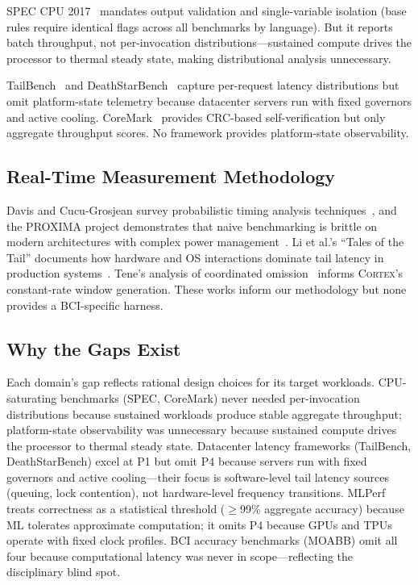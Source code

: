 \documentclass[sigplan,10pt]{acmart}
\newcommand{\cortex}{\textsc{Cortex}}
\begin{document}
SPEC CPU 2017~\cite{spec2017} mandates output validation and single-variable isolation (base rules require identical flags across all benchmarks by language). But it reports batch throughput, not per-invocation distributions---sustained compute drives the processor to thermal steady state, making distributional analysis unnecessary.

TailBench~\cite{kasture2016tailbench} and DeathStarBench~\cite{gan2019deathstar} capture per-request latency distributions but omit platform-state telemetry because datacenter servers run with fixed governors and active cooling. CoreMark~\cite{eembc_coremark} provides CRC-based self-verification but only aggregate throughput scores. No framework provides platform-state observability.

\subsection{Real-Time Measurement Methodology}

Davis and Cucu-Grosjean survey probabilistic timing analysis techniques~\cite{davis2019timing}, and the PROXIMA project demonstrates that naive benchmarking is brittle on modern architectures with complex power management~\cite{cazorla2016proxima}. Li et al.'s ``Tales of the Tail'' documents how hardware and OS interactions dominate tail latency in production systems~\cite{li2014tail}. Tene's analysis of coordinated omission~\cite{tene2015latency} informs \cortex{}'s constant-rate window generation. These works inform our methodology but none provides a BCI-specific harness.

\subsection{Why the Gaps Exist}

Each domain's gap reflects rational design choices for its target workloads. CPU-saturating benchmarks (SPEC, CoreMark) never needed per-invocation distributions because sustained workloads produce stable aggregate throughput; platform-state observability was unnecessary because sustained compute drives the processor to thermal steady state. Datacenter latency frameworks (TailBench, DeathStarBench) excel at P1 but omit P4 because servers run with fixed governors and active cooling---their focus is software-level tail latency sources (queuing, lock contention), not hardware-level frequency transitions. MLPerf treats correctness as a statistical threshold ($\geq$99\% aggregate accuracy) because ML tolerates approximate computation; it omits P4 because GPUs and TPUs operate with fixed clock profiles. BCI accuracy benchmarks (MOABB) omit all four because computational latency was never in scope---reflecting the disciplinary blind spot.
\end{document}
